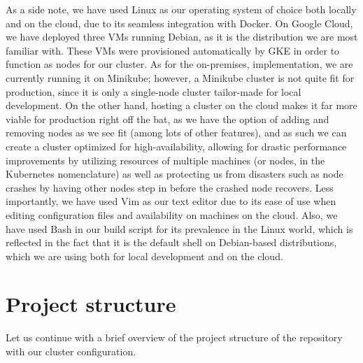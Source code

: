 \documentclass[thesis=B,english]{FITthesis}[2019/12/23]
\begin{document}
As a side note, we have used Linux as our operating system of choice both locally and on the cloud, due to its seamless integration with Docker. On Google Cloud, we have deployed three VMs running Debian, as it is the distribution we are most familiar with. These VMs were provisioned automatically by GKE in order to function as nodes for our cluster. As for the on-premises, implementation, we are currently running it on Minikube; however, a Minikube cluster is not quite fit for production, since it is only a single-node cluster tailor-made for local development. On the other hand, hosting a cluster on the cloud makes it far more viable for production right off the bat, as we have the option of adding and removing nodes as we see fit (among lots of other features), and as such we can create a cluster optimized for high-availability, allowing for drastic performance improvements by utilizing resources of multiple machines (or nodes, in the Kubernetes nomenclature) as well as protecting us from disasters such as node crashes by having other nodes step in before the crashed node recovers. \cite{high-availability}
\newline
Less importantly, we have used Vim as our text editor due to its ease of use when editing configuration files and availability on machines on the cloud. Also, we have used Bash in our build script for its prevalence in the Linux world, which is reflected in the fact that it is the default shell on Debian-based distributions, which we are using both for local development and on the cloud.


\section{Project structure}

Let us continue with a brief overview of the project structure of the repository with our cluster configuration.
\end{document}
